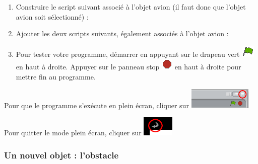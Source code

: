
\vspace{12pt}



\begin{enumerate}
\item Construire le script suivant associé à l'objet avion (il faut donc que l'objet avion soit sélectionné) :
\item Ajouter les deux scripts suivants, également associés à l'objet avion :
\item Pour tester votre programme, démarrer en appuyant sur le drapeau vert \includegraphics[width=.7cm]{./images/scratch/DrapeauVert} en haut à droite. Appuyer sur le panneau stop \includegraphics[width=.7cm]{./images/scratch/Stop} en haut à droite pour mettre fin au programme.
\end{enumerate}

Pour que le programme s'exécute en plein écran, cliquer sur \includegraphics[width=3cm]{./images/scratch/ScratchPleinEcran}

Pour quitter le mode plein écran, cliquer sur \includegraphics[width=1.5cm]{./images/scratch/ScratchQuitterPleinEcran}


\subsubsection{Un nouvel objet : l'obstacle}       

